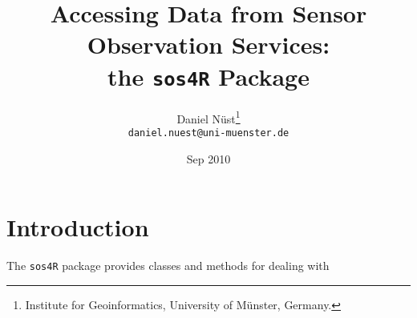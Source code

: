 \documentclass{article}
\begin{document}
\title{Accessing Data from Sensor Observation Services:\\ the {\tt sos4R} Package}
\author{Daniel N\"{u}st\footnote{Institute for Geoinformatics, University of M\"{u}nster, Germany.}\\ {\tt daniel.nuest@uni-muenster.de}}

\date{Sep 2010}

\maketitle
\tableofcontents

\section{Introduction}

The {\tt sos4R} package provides classes and methods for dealing with
%
%
%
\end{document}
